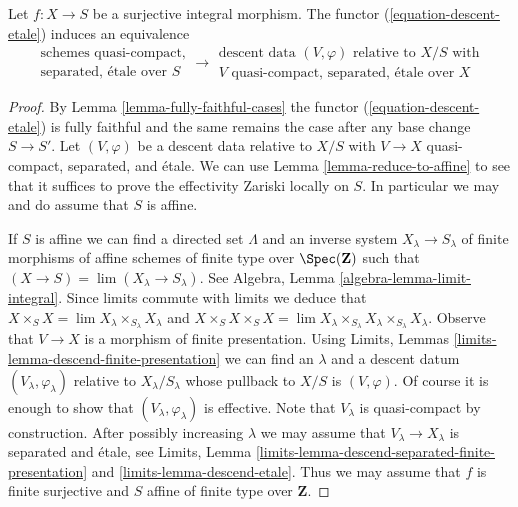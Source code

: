 \begin{proposition}
\label{proposition-effective}
Let $f : X \to S$ be a surjective integral morphism.
The functor (\ref{equation-descent-etale}) induces an equivalence
$$
\begin{matrix}
\text{schemes quasi-compact,}\\
\text{separated, \'etale over }S
\end{matrix}
\longrightarrow
\begin{matrix}
\text{descent data }(V, \varphi)\text{ relative to }X/S\text{ with}\\
V\text{ quasi-compact, separated, \'etale over }X
\end{matrix}
$$
\end{proposition}

\begin{proof}
By Lemma \ref{lemma-fully-faithful-cases} the
functor (\ref{equation-descent-etale})
is fully faithful and the same remains the case after any
base change $S \to S'$. Let $(V, \varphi)$ be a descent data
relative to $X/S$ with $V \to X$ quasi-compact, separated, and \'etale.
We can use Lemma \ref{lemma-reduce-to-affine}
to see that it suffices to prove the effectivity 
Zariski locally on $S$. In particular we may and do
assume that $S$ is affine.

\medskip\noindent
If $S$ is affine we can find a directed set $\Lambda$ and
an inverse system $X_\lambda \to S_\lambda$
of finite morphisms of affine schemes of finite type over
$\Spec(\mathbf{Z})$ such that $(X \to S) = \lim (X_\lambda \to S_\lambda)$.
See Algebra, Lemma \ref{algebra-lemma-limit-integral}.
Since limits commute with limits we deduce that
$X \times_S X = \lim X_\lambda \times_{S_\lambda} X_\lambda$
and 
$X \times_S X \times_S X = \lim
X_\lambda \times_{S_\lambda} X_\lambda \times_{S_\lambda} X_\lambda$.
Observe that $V \to X$ is a morphism of finite presentation.
Using Limits, Lemmas \ref{limits-lemma-descend-finite-presentation}
we can find an $\lambda$ and a descent datum $(V_\lambda, \varphi_\lambda)$
relative to $X_\lambda/S_\lambda$ whose pullback to $X/S$ is
$(V, \varphi)$. Of course it is enough to show that
$(V_\lambda, \varphi_\lambda)$ is effective. Note that $V_\lambda$
is quasi-compact by construction.
After possibly increasing $\lambda$ we may assume
that $V_\lambda \to X_\lambda$ is separated and \'etale, see
Limits, Lemma \ref{limits-lemma-descend-separated-finite-presentation} and
\ref{limits-lemma-descend-etale}.
Thus we may assume that $f$ is finite surjective and
$S$ affine of finite type over $\mathbf{Z}$.


\end{proof}
